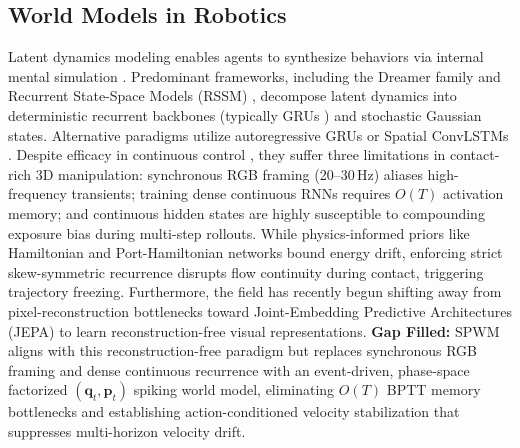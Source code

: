 \documentclass{article}
\begin{document}
\subsection{World Models in Robotics}
Latent dynamics modeling enables agents to synthesize behaviors via internal mental simulation \cite{ha2018world}. Predominant frameworks, including the Dreamer family and Recurrent State-Space Models (RSSM) \cite{hafner2019dreamer, hafner2020mastering, hafner2025dreamerv3}, decompose latent dynamics into deterministic recurrent backbones (typically GRUs \cite{cho2014learning}) and stochastic Gaussian states. Alternative paradigms utilize autoregressive GRUs or Spatial ConvLSTMs \cite{shi2015convolutional, finn2016unsupervised}. Despite efficacy in continuous control \cite{wu2023daydreamer}, they suffer three limitations in contact-rich 3D manipulation: synchronous RGB framing (20--30\,Hz) aliases high-frequency transients; training dense continuous RNNs requires $O(T)$ activation memory; and continuous hidden states are highly susceptible to compounding exposure bias \cite{bengio2015scheduled} during multi-step rollouts. While physics-informed priors like Hamiltonian \cite{greydanus2019hamiltonian} and Port-Hamiltonian networks \cite{zhong2020symplectic, duong2021hamiltonian} bound energy drift, enforcing strict skew-symmetric recurrence disrupts flow continuity during contact, triggering trajectory freezing. Furthermore, the field has recently begun shifting away from pixel-reconstruction bottlenecks toward Joint-Embedding Predictive Architectures (JEPA) \cite{bardes2024vjepa} to learn reconstruction-free visual representations. \textbf{Gap Filled:} SPWM aligns with this reconstruction-free paradigm but replaces synchronous RGB framing and dense continuous recurrence with an event-driven, phase-space factorized $(\mathbf{q}_t, \mathbf{p}_t)$ spiking world model, eliminating $O(T)$ BPTT memory bottlenecks and establishing action-conditioned velocity stabilization that suppresses multi-horizon velocity drift.
\end{document}

